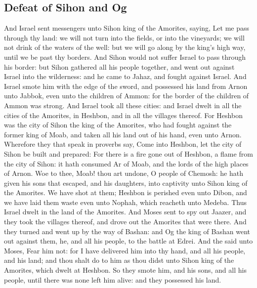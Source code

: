 \begin{biblechapter}
\section*{Defeat of Sihon and Og}
\verse And Israel sent messengers unto Sihon king of the Amorites, saying,
\verse Let me pass through thy land: we will not turn into the fields, or into the vineyards; we will not drink of the waters of the well: but we will go along by the king's high way, until we be past thy borders.
\verse And Sihon would not suffer Israel to pass through his border: but Sihon gathered all his people together, and went out against Israel into the wilderness: and he came to Jahaz, and fought against Israel.
\verse And Israel smote him with the edge of the sword, and possessed his land from Arnon unto Jabbok, even unto the children of Ammon: for the border of the children of Ammon was strong.
\verse And Israel took all these cities: and Israel dwelt in all the cities of the Amorites, in Heshbon, and in all the villages thereof.
\verse For Heshbon was the city of Sihon the king of the Amorites, who had fought against the former king of Moab, and taken all his land out of his hand, even unto Arnon.
\verse Wherefore they that speak in proverbs say, Come into Heshbon, let the city of Sihon be built and prepared:
\verse For there is a fire gone out of Heshbon, a flame from the city of Sihon: it hath consumed Ar of Moab, and the lords of the high places of Arnon.
\verse Woe to thee, Moab! thou art undone, O people of Chemosh: he hath given his sons that escaped, and his daughters, into captivity unto Sihon king of the Amorites.
\verse We have shot at them; Heshbon is perished even unto Dibon, and we have laid them waste even unto Nophah, which reacheth unto Medeba.
\verse Thus Israel dwelt in the land of the Amorites.
\verse And Moses sent to spy out Jaazer, and they took the villages thereof, and drove out the Amorites that were there.
\verse And they turned and went up by the way of Bashan: and Og the king of Bashan went out against them, he, and all his people, to the battle at Edrei.
\verse And the \LORD said unto Moses, Fear him not: for I have delivered him into thy hand, and all his people, and his land; and thou shalt do to him as thou didst unto Sihon king of the Amorites, which dwelt at Heshbon.
\verse So they smote him, and his sons, and all his people, until there was none left him alive: and they possessed his land.
\end{biblechapter}

